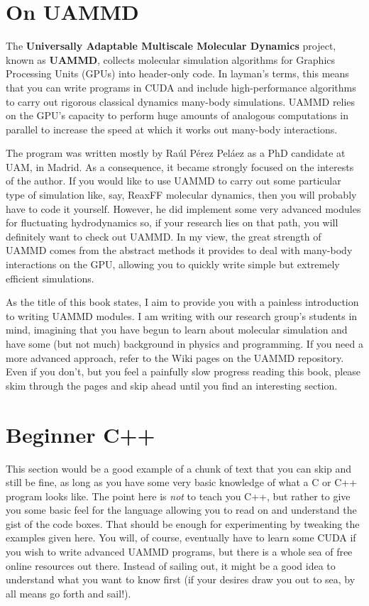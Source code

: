 \section*{On UAMMD}

The \textbf{Universally Adaptable Multiscale Molecular Dynamics} project,
known as \textbf{UAMMD}, collects molecular simulation algorithms for Graphics 
Processing Units (GPUs) into header-only code. In layman's terms, this means 
that you can write programs in CUDA and include high-performance algorithms to 
carry out rigorous classical dynamics many-body simulations. UAMMD relies on the 
GPU's capacity to perform huge amounts of analogous computations in parallel to 
increase the speed at which it works out many-body interactions.

The program was written mostly by Ra\'ul P\'erez Pel\'aez as a PhD candidate at
UAM, in Madrid. As a consequence, it became strongly focused on the interests of
the author. If you would like to use UAMMD to carry out some particular type of
simulation like, say, ReaxFF molecular dynamics, then you will probably have to
code it yourself. However, he did implement some very advanced modules for
fluctuating hydrodynamics so, if your research lies on that path, you will
definitely want to check out UAMMD. In my view, the great strength of UAMMD
comes from the abstract methods it provides to deal with many-body interactions
on the GPU, allowing you to quickly write simple but extremely efficient
simulations.

As the title of this book states, I aim to provide you with a painless 
introduction to writing UAMMD modules. I am writing with our research group's 
students in mind, imagining that you have begun to learn about molecular
simulation and have some (but not much) background in physics and programming.
If you need a more advanced approach, refer to the Wiki pages on the UAMMD
repository. Even if you don't, but you feel a painfully slow progress reading
this book, please skim through the pages and skip ahead until you find an
interesting section.

\section*{Beginner C++}

This section would be a good example of a chunk of text that you can skip and 
still be fine, as long as you have some very basic knowledge of what a C or C++ 
program looks like. The point here is \textit{not} to teach you C++, but rather 
to give you some basic feel for the language allowing you to read on and 
understand the gist of the code boxes. That should be enough for experimenting 
by tweaking the examples given here. You will, of course, eventually have to 
learn some CUDA if you wish to write advanced UAMMD programs, but there is a 
whole sea of free online resources out there. Instead of sailing out, it might 
be a good idea to understand what you want to know first (if your desires draw 
you out to sea, by all means go forth and sail!).

